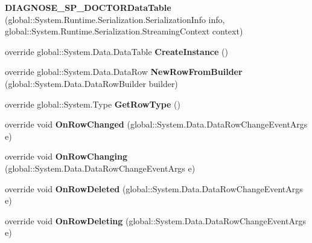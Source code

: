 \begin{CompactItemize}
\item 
\textbf{DIAGNOSE\_\-SP\_\-DOCTORDataTable} (global::System.Runtime.Serialization.SerializationInfo info, global::System.Runtime.Serialization.StreamingContext context)\label{class_automatic_medical_system_1_1_data_set1_1_1_d_i_a_g_n_o_s_e___s_p___d_o_c_t_o_r_data_table_57d16e4aec4d79fd576df6d9200b2bf4}

\item 
override global::System.Data.DataTable \textbf{CreateInstance} ()\label{class_automatic_medical_system_1_1_data_set1_1_1_d_i_a_g_n_o_s_e___s_p___d_o_c_t_o_r_data_table_6e6953e394b0beb18694725e7c75107c}

\item 
override global::System.Data.DataRow \textbf{NewRowFromBuilder} (global::System.Data.DataRowBuilder builder)\label{class_automatic_medical_system_1_1_data_set1_1_1_d_i_a_g_n_o_s_e___s_p___d_o_c_t_o_r_data_table_39761aaaa55ee101ebce534f776b8ba7}

\item 
override global::System.Type \textbf{GetRowType} ()\label{class_automatic_medical_system_1_1_data_set1_1_1_d_i_a_g_n_o_s_e___s_p___d_o_c_t_o_r_data_table_226f7acaa72b668fa72faa3ff6839013}

\item 
override void \textbf{OnRowChanged} (global::System.Data.DataRowChangeEventArgs e)\label{class_automatic_medical_system_1_1_data_set1_1_1_d_i_a_g_n_o_s_e___s_p___d_o_c_t_o_r_data_table_da0ea23bf47090dbb703f6f7e0be7b1d}

\item 
override void \textbf{OnRowChanging} (global::System.Data.DataRowChangeEventArgs e)\label{class_automatic_medical_system_1_1_data_set1_1_1_d_i_a_g_n_o_s_e___s_p___d_o_c_t_o_r_data_table_3b06945e77686107353fb9ac3867093b}

\item 
override void \textbf{OnRowDeleted} (global::System.Data.DataRowChangeEventArgs e)\label{class_automatic_medical_system_1_1_data_set1_1_1_d_i_a_g_n_o_s_e___s_p___d_o_c_t_o_r_data_table_75b0863e2344b1a8329abbea38e8f2e2}

\item 
override void \textbf{OnRowDeleting} (global::System.Data.DataRowChangeEventArgs e)\label{class_automatic_medical_system_1_1_data_set1_1_1_d_i_a_g_n_o_s_e___s_p___d_o_c_t_o_r_data_table_2071d04afe71eb4121eb507ddbb1acd5}

\end{CompactItemize}
